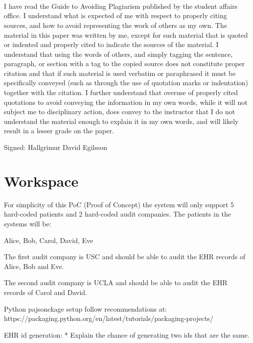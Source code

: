 \documentclass[11pt]{article}
\title{
\huge\nafnanamskeidi\\
\vspace{8mm}
\nafnaverkefni\vspace{\haednemanda}}
\author{\nafnanemanda\\
        \nafnakennara\vspace{\haeddagsetningar}}
\date{\dagsetning\vspace{\haedtexta}}
\begin{document}
	\maketitle
	\thispagestyle{bls1}
	
	\begin{flushleft}
		
		\vspace{24mm}
		I have read the Guide to Avoiding Plagiarism published by the student affairs office. I understand what is expected of me with respect to properly citing sources, and how to avoid representing the work of others as my own. The material in this paper was written by me, except for such material that is quoted or indented and properly cited to indicate the sources of the material. I understand that using the words of others, and simply tagging the sentence, paragraph, or section with a tag to the copied source does not constitute proper citation and that if such material is used verbatim or paraphrased it must be specifically conveyed (such as through the use of quotation marks or indentation) together with the citation. I further understand that overuse of properly cited quotations to avoid conveying the information in my own words, while it will not subject me to disciplinary action, does convey to the instructor that I do not understand the material enough to explain it in my own words, and will likely result in a lesser grade on the paper.
		
		Signed: Hallgrimur David Egilsson
		
		\newpage

		\section{Workspace}

		For simplicity of this PoC (Proof of Concept) the system will only support 5 hard-coded patients and 2 hard-coded audit companies. The patients in the systems will be:

		Alice, Bob, Carol, David, Eve

		The first audit company is USC and should be able to audit the EHR records of Alice, Bob and Eve.

		The second audit company is UCLA and should be able to audit the EHR records of Carol and David.

		Python pajsonckage setup follow recommendations at: https://packaging.python.org/en/latest/tutorials/packaging-projects/

		EHR id generation:
		* Explain the chance of generating two ids that are the same.


\end{flushleft}
\end{document}
